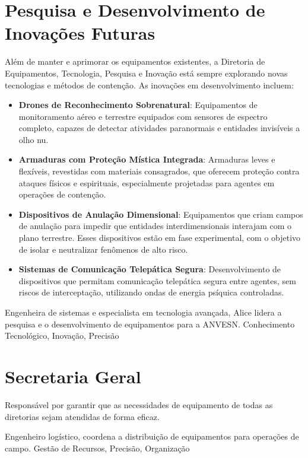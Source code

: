 \section{Pesquisa e Desenvolvimento de Inovações Futuras}
Além de manter e aprimorar os equipamentos existentes, a Diretoria de Equipamentos, Tecnologia, Pesquisa e Inovação está sempre explorando novas tecnologias e métodos de contenção. As inovações em desenvolvimento incluem:

\begin{itemize}
    \item \textbf{Drones de Reconhecimento Sobrenatural}: Equipamentos de monitoramento aéreo e terrestre equipados com sensores de espectro completo, capazes de detectar atividades paranormais e entidades invisíveis a olho nu.
    \item \textbf{Armaduras com Proteção Mística Integrada}: Armaduras leves e flexíveis, revestidas com materiais consagrados, que oferecem proteção contra ataques físicos e espirituais, especialmente projetadas para agentes em operações de contenção.
    \item \textbf{Dispositivos de Anulação Dimensional}: Equipamentos que criam campos de anulação para impedir que entidades interdimensionais interajam com o plano terrestre. Esses dispositivos estão em fase experimental, com o objetivo de isolar e neutralizar fenômenos de alto risco.
    \item \textbf{Sistemas de Comunicação Telepática Segura}: Desenvolvimento de dispositivos que permitam comunicação telepática segura entre agentes, sem riscos de interceptação, utilizando ondas de energia psíquica controladas.
\end{itemize}




{Engenheira de sistemas e especialista em tecnologia avançada, Alice lidera a pesquisa e o desenvolvimento de equipamentos para a ANVESN.}
{Conhecimento Tecnológico, Inovação, Precisão}

\section{Secretaria Geral}
Responsável por garantir que as necessidades de equipamento de todas as diretorias sejam atendidas de forma eficaz.

{Engenheiro logístico, coordena a distribuição de equipamentos para operações de campo.}
{Gestão de Recursos, Precisão, Organização}

